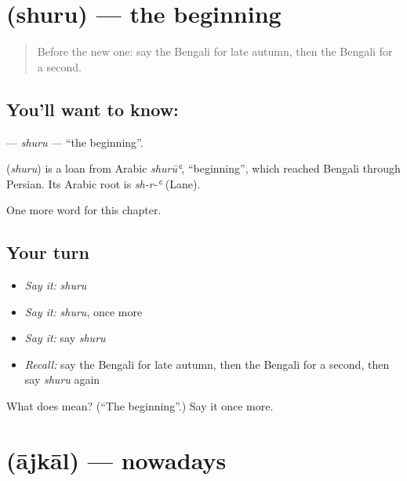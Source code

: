 \section[\texorpdfstring{\bn{শুরু} (shuru)}{শুরু (shuru)}]{ (shuru) — the beginning}

\label{lesson:BN-C93-shuru}



\begin{quote}
Before the new one: say the Bengali for late autumn, then the Bengali for a second.
\end{quote}

\subsection*{You'll want to know: }
\textbf{} — \emph{shuru} — \textquotedblleft{}the beginning\textquotedblright{}.

\begin{cousinweb}
\textbf{} (\emph{shuru}) is a loan from Arabic \emph{shurūʿ}, \textquotedblleft{}beginning\textquotedblright{}, which reached Bengali through Persian. Its Arabic root is \emph{sh-r-ʿ} (Lane).
\end{cousinweb}

\begin{grammarlens}[title={What you've built}]
One more word for this chapter.
\end{grammarlens}

\subsection*{Your turn}
\begin{itemize}
\raggedright
  \item \emph{Say it:} \emph{shuru}
  \item \emph{Say it:} \emph{shuru}, once more
  \item \emph{Say it:} say \emph{shuru}
  \item \emph{Recall:} say the Bengali for late autumn, then the Bengali for a second, then say \emph{shuru} again
\end{itemize}

\begin{tcolorbox}[breakable,colback=teal!4,colframe=teal!35!black,title={Before you move on}]
What does  mean? (\textquotedblleft{}The beginning\textquotedblright{}.) Say it once more.
\end{tcolorbox}
\section[\texorpdfstring{\bn{আজকাল} (ājkāl)}{আজকাল (ājkāl)}]{ (ājkāl) — nowadays}

